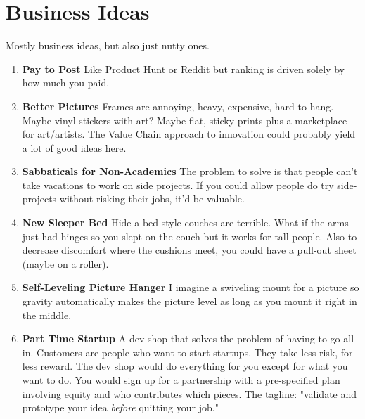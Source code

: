 \documentclass[paper=a4, fontsize=11pt]{scrartcl} %
\numberwithin{equation}{section} %
\numberwithin{figure}{section} %
\numberwithin{table}{section} %
\begin{document}

\section{Business Ideas}

Mostly business ideas, but also just nutty ones.

\begin{enumerate}



\item \textbf{Pay to Post} Like Product Hunt or Reddit but ranking is driven solely by how much you paid.

\item \textbf{Better Pictures} Frames are annoying, heavy, expensive, hard to hang.  Maybe vinyl stickers with art?  Maybe flat, sticky prints plus a marketplace for art/artists.  The Value Chain approach to innovation could probably yield a lot of good ideas here.

\item \textbf{Sabbaticals for Non-Academics} The problem to solve is that people can't take vacations to work on side projects.  If you could allow people do try side-projects without risking their jobs, it'd be valuable.  

\item \textbf{New Sleeper Bed} Hide-a-bed style couches are terrible.  What if the arms just had hinges so you slept on the couch but it works for tall people.  Also to decrease discomfort where the cushions meet, you could have a pull-out sheet (maybe on a roller). 

\item \textbf{Self-Leveling Picture Hanger} I imagine a swiveling mount for a picture so gravity automatically makes the picture level as long as you mount it right in the middle.


\item \textbf{Part Time Startup} A dev shop that solves the problem of having to go all in.  Customers are people who want to start startups.  They take less risk, for less reward.  The dev shop would do everything for you except for what you want to do.  You would sign up for a partnership with a pre-specified plan involving equity and who contributes which pieces.  The tagline: "validate and prototype your idea \textit{before} quitting your job."


\end{enumerate}
\end{document}
